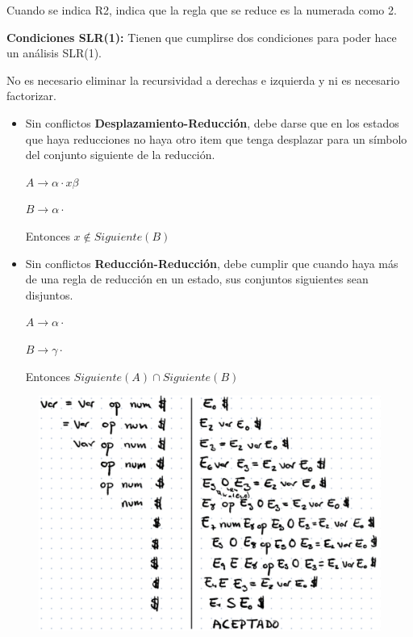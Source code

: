 \documentclass[12pt]{report} %
\begin{document}
Cuando se indica R2, indica que la regla que se reduce es la numerada como 2.

\textbf{Condiciones SLR(1):}
Tienen que cumplirse dos condiciones para poder hace un análisis SLR(1). 

No es necesario eliminar la recursividad a derechas e izquierda y ni es necesario factorizar.

\begin{itemize}
  \item Sin conflictos \textbf{Desplazamiento-Reducción}, debe darse que en los estados que haya reducciones no haya otro item que tenga desplazar para un símbolo del conjunto siguiente de la reducción.
  
  $A \rightarrow \alpha \cdot x \beta$

  $B \rightarrow \alpha \cdot$

  Entonces $x \notin Siguiente(B)$

  \item Sin conflictos \textbf{Reducción-Reducción}, debe cumplir que cuando haya más de una regla de reducción en un estado, sus conjuntos siguientes sean disjuntos.
    
  $A \rightarrow \alpha \cdot $

  $B \rightarrow \gamma \cdot$

  Entonces $Siguiente(A) \cap Siguiente(B)$
\end{itemize}



\begin{figure}[H]
  {\includegraphics[scale=.5]{2021-04-13 14_59_35-ASintactico.pdf - Foxit Reader.png}}
\end{figure}
\end{document}
